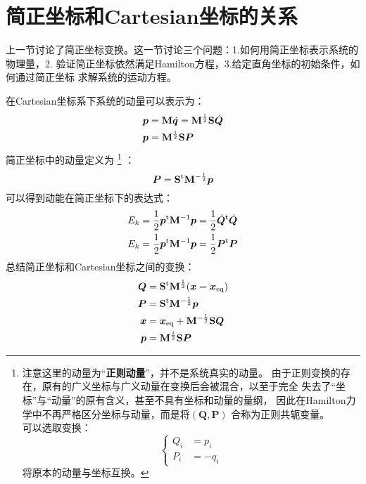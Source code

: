     \section{简正坐标和Cartesian坐标的关系}
    上一节讨论了简正坐标变换。这一节讨论三个问题：1.如何用简正坐标表示系统的物理量，2.
    验证简正坐标依然满足Hamilton方程，3.给定直角坐标的初始条件，如何通过简正坐标
    求解系统的运动方程。

    \splitline

    在Cartesian坐标系下系统的动量可以表示为：
    \begin{equation}
        \begin{split}
        \bm{p} &= \mathbf{M}\dot{\bm{q}} = \mathbf{M}^{\frac 12} \mathbf{S}\dot{\bm{Q}}\\
        \bm{p} &= \mathbf{M}^{\frac{1}{2}}\mathbf{S}\bm{P}
        \end{split}
    \end{equation}
    简正坐标中的动量定义为
    \footnote{
        注意这里的动量为“\textbf{正则动量}”，并不是系统真实的动量。
        由于正则变换的存在，原有的广义坐标与广义动量在变换后会被混合，以至于完全
        失去了“坐标”与“动量”的原有含义，甚至不具有坐标和动量的量纲，
        因此在Hamilton力学中不再严格区分坐标与动量，而是将$(\bm{Q}, \bm{P})$
        合称为正则共轭变量。\\
        可以选取变换：
        \begin{equation}
            \left\{
                \begin{split}
                    Q_{i} &= p_i\\
                    P_{i} &= -q_i
                \end{split}
            \right.
        \end{equation}
        将原本的动量与坐标互换。
    }
    ：
    \begin{equation}
        \bm{P} = \mathbf{S}^{\mathrm{t}} \mathbf{M}^{-\frac 12} \bm{p}
    \end{equation}
    可以得到动能在简正坐标下的表达式：
    \begin{equation}
        \begin{split}
        E_{k} &= \frac{1}{2}\bm{p}^{\mathrm{t}}\mathbf{M}^{-1}\bm{p} = \frac{1}{2}\dot{\bm{Q}}^{\mathrm{t}}\dot{\bm{Q}}\\
        E_{k} &= \frac{1}{2}\bm{p}^{\mathrm{t}}\mathbf{M}^{-1}\bm{p} = \frac{1}{2}\bm{P}^{\mathrm{t}}\bm{P}
        \end{split}
    \end{equation}
    总结简正坐标和Cartesian坐标之间的变换：
    \begin{equation}
        \begin{aligned}
        \bm{Q} &= \mathbf{S}^\mathrm{t} \mathbf{M}^{\frac 12} (\bm{x-x}_\mathrm{eq})\\
        \bm{P} &= \mathbf{S}^\mathrm{t} \mathbf{M}^{-\frac 12} \bm{p}\\
        \bm{x} &= \bm{x}_\mathrm{eq} + \mathbf{M}^{-\frac 12}\mathbf{S}\bm{Q}\\
        \bm{p} &= \mathbf{M}^{\frac 12}\mathbf{S}\bm{P}
        \end{aligned}
        \label{normal mode and cartesian coordinate}
    \end{equation}

